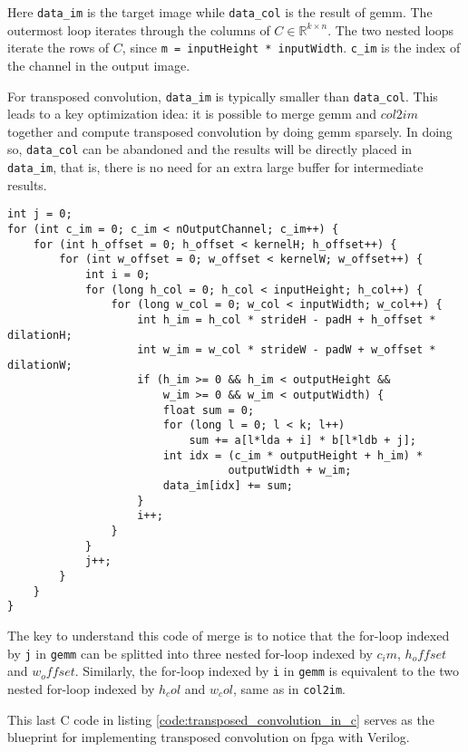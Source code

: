 Here \texttt{data_im} is the target image while \texttt{data_col} is the result of \gls{gemm}.
The outermost loop iterates through the columns of $C \in \mathbb{R}^{k \times n}$. The two nested loops
iterate the rows of $C$, since \texttt{m = inputHeight * inputWidth}. \texttt{c_im} is the
index of the channel in the output image. %

For transposed convolution, \texttt{data_im} is typically smaller than
\texttt{data_col}. This leads to a key optimization idea: it is possible to merge \gls{gemm} and
$col2im$ together and compute transposed convolution by doing \gls{gemm} sparsely. In doing so,
\texttt{data_col} can be abandoned and the results will be directly placed in \texttt{data_im},
that is, there is no need for an extra large buffer for intermediate results.

\begin{code}
\begin{verbatim}
int j = 0;
for (int c_im = 0; c_im < nOutputChannel; c_im++) {
    for (int h_offset = 0; h_offset < kernelH; h_offset++) {
        for (int w_offset = 0; w_offset < kernelW; w_offset++) {
            int i = 0;
            for (long h_col = 0; h_col < inputHeight; h_col++) {
                for (long w_col = 0; w_col < inputWidth; w_col++) {
                    int h_im = h_col * strideH - padH + h_offset * dilationH;
                    int w_im = w_col * strideW - padW + w_offset * dilationW;
                    if (h_im >= 0 && h_im < outputHeight &&
                        w_im >= 0 && w_im < outputWidth) {
                        float sum = 0;
                        for (long l = 0; l < k; l++)
                            sum += a[l*lda + i] * b[l*ldb + j];
                        int idx = (c_im * outputHeight + h_im) *
                                  outputWidth + w_im;
                        data_im[idx] += sum;
                    }
                    i++;
                }
            }
            j++;
        }
    }
}
\end{verbatim}
\label{code:transposed_convolution_in_c}
\end{code}

The key to understand this code of merge is to notice that the for-loop indexed by \texttt{j} in
\texttt{gemm} can be splitted into three nested for-loop indexed by $c_im$, $h_offset$ and $w_offset$.
Similarly, the for-loop indexed by \texttt{i} in \texttt{gemm} is equivalent to the two
nested for-loop indexed by $h_col$ and $w_col$, same as in \texttt{col2im}.

This last C code in listing \ref{code:transposed_convolution_in_c} serves as the blueprint for implementing
transposed convolution on \gls{fpga} with Verilog.

\clearpage %
